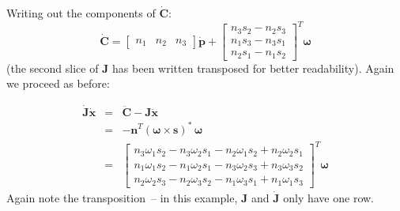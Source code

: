 Writing out the components of $\dot{\mathbf{C}}$:
\begin{equation}
\dot{\mathbf{C}} = \left[\begin{array}{ccc} n_1 & n_2 & n_3 \end{array}\right] \dot{\mathbf{p}} +
    \left[\begin{array}{c}
    n_3 s_2 - n_2 s_3 \\
    n_1 s_3 - n_3 s_1 \\
    n_2 s_1 - n_1 s_2 \end{array}\right]^T \bm{\omega}
\end{equation}
(the second slice of $\mathbf{J}$ has been written transposed for better readability). Again
we proceed as before:

\begin{eqnarray}
\dot{\mathbf{J}}\dot{\mathbf{x}} & = & \ddot{\mathbf{C}} - \mathbf{J}\ddot{\mathbf{x}} \nonumber\\
&=& -\mathbf{n}^T (\bm{\omega}\times\mathbf{s})^*\,\bm{\omega} \nonumber\\
&=& \left[\begin{array}{c}
    n_3 \omega_1 s_2 - n_3 \omega_2 s_1 - n_2 \omega_1 s_2 + n_2 \omega_2 s_1 \\
    n_1 \omega_1 s_2 - n_1 \omega_2 s_1 - n_3 \omega_2 s_3 + n_3 \omega_3 s_2 \\
    n_2 \omega_2 s_3 - n_2 \omega_3 s_2 - n_1 \omega_3 s_1 + n_1 \omega_1 s_3
    \end{array}\right]^T \bm{\omega}
\end{eqnarray}
Again note the transposition~-- in this example, $\mathbf{J}$ and $\dot{\mathbf{J}}$ only
have one row.
